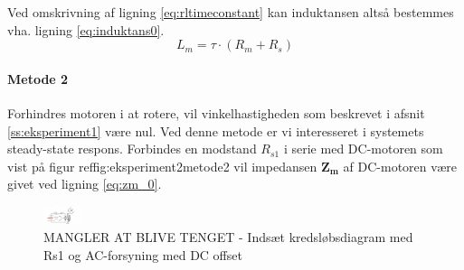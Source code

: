 Ved omskrivning af ligning \ref{eq:rltimeconstant} kan induktansen altså bestemmes vha. ligning \ref{eq:induktans0}.
\begin{equation}
	L_m=\tau\cdot(R_m+R_s)
	\label{eq:induktans0} 
 \end{equation}
\paragraph{Metode 2}
Forhindres motoren i at rotere, vil vinkelhastigheden som beskrevet i afsnit \ref{ss:eksperiment1} være nul.
Ved denne metode er vi interesseret i systemets steady-state respons.
Forbindes en modstand \(R_{s1}\) i serie med DC-motoren som vist på figur ref{fig:eksperiment2metode2}
vil impedansen \(\mathbf{Z_m}\) af DC-motoren være givet ved ligning \ref{eq:zm_0}.

\begin{figure}[!th]
\centering
\includegraphics[width=0.1\textwidth]{./graphics/Mangleratblivetegnet3}
%
\caption[]{MANGLER AT BLIVE TENGET - Indsæt kredsløbsdiagram med Rs1 og AC-forsyning med DC offset}
\label{fig:eksperiment2metode2}
\end{figure}


